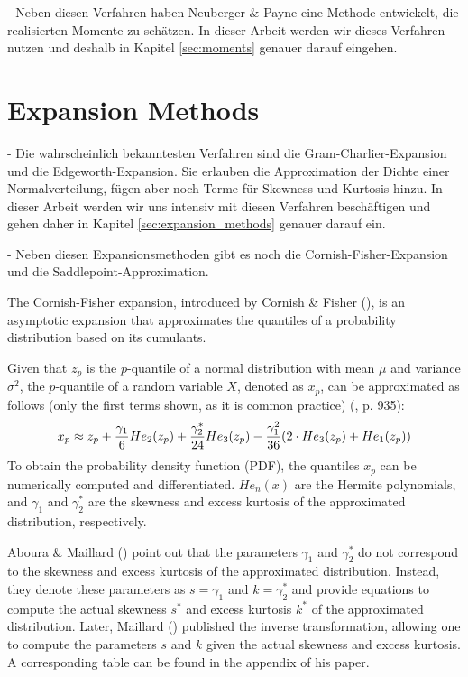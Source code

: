 - Neben diesen Verfahren haben Neuberger \& Payne eine Methode entwickelt, die realisierten Momente zu schätzen. In dieser Arbeit werden wir dieses Verfahren nutzen und deshalb in Kapitel \ref{sec:moments} genauer darauf eingehen.

\section{Expansion Methods}

- Die wahrscheinlich bekanntesten Verfahren sind die Gram-Charlier-Expansion und die Edgeworth-Expansion. Sie erlauben die Approximation der Dichte einer Normalverteilung, fügen aber noch Terme für Skewness und Kurtosis hinzu. In dieser Arbeit werden wir uns intensiv mit diesen Verfahren beschäftigen und gehen daher in Kapitel \ref{sec:expansion_methods} genauer darauf ein.

- Neben diesen Expansionsmethoden gibt es noch die Cornish-Fisher-Expansion und die Saddlepoint-Approximation.

The Cornish-Fisher expansion, introduced by Cornish \& Fisher (\citeyear{cornishMomentsCumulantsSpecification1938}), is an asymptotic expansion that approximates the quantiles of a probability distribution based on its cumulants.

Given that $z_p$ is the $p$-quantile of a normal distribution with mean $\mu$ and variance $\sigma^2$, the $p$-quantile of a random variable $X$, denoted as $x_p$, can be approximated as follows (only the first terms shown, as it is common practice) (\cite{abramowitzHandbookMathematicalFunctions1968}, p. 935):
\begin{align}
    x_p \approx z_p + \frac{\gamma_1}{6}He_2(z_p) + \frac{\gamma_2^*}{24}He_3(z_p) - \frac{\gamma_1^2}{36}(2\cdot He_3(z_p) + He_1(z_p)) \notag
\end{align}
To obtain the probability density function (PDF), the quantiles $x_p$ can be numerically computed and differentiated. $He_n(x)$ are the Hermite polynomials, and $\gamma_1$ and $\gamma_2^*$ are the skewness and excess kurtosis of the approximated distribution, respectively.

Aboura \& Maillard (\citeyear{abouraOptionPricingSkewness2016}) point out that the parameters $\gamma_1$ and $\gamma_2^*$ do not correspond to the skewness and excess kurtosis of the approximated distribution. Instead, they denote these parameters as $s = \gamma_1$ and $k = \gamma_2^*$ and provide equations to compute the actual skewness $s^*$ and excess kurtosis $k^*$ of the approximated distribution. Later, Maillard (\citeyear{maillardUserGuideCornish2018}) published the inverse transformation, allowing one to compute the parameters $s$ and $k$ given the actual skewness and excess kurtosis. A corresponding table can be found in the appendix of his paper.

